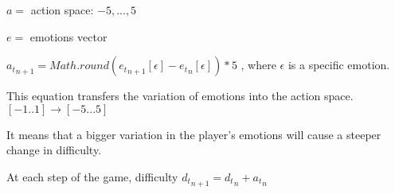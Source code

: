 \documentclass[11pt]{article}
\begin{document}
\thispagestyle{empty}






$a=$ action space: ${-5,...,5}$
 
$e =$ emotions vector 

${a_t}_{n+1} = Math.round({e_t}_{n+1}[\epsilon] - {e_t}_{n}[\epsilon] ) *5$ , where $\epsilon$ is a specific emotion.

This equation transfers the variation of emotions into the action space. $[-1..1] \rightarrow [-5...5]$

It means that a bigger variation in the player's emotions will cause a steeper change in difficulty.

At each step of the game, difficulty ${d_t}_{n+1} = {d_t}_{n} + {a_t}_n  $
\vspace{0.5cm}
\end{document}

